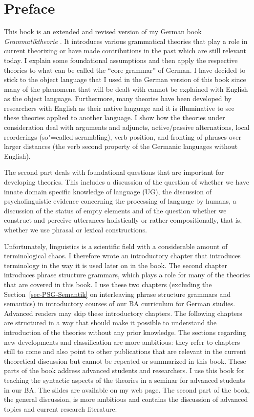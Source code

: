 \chapter{Preface}

This book is an extended and revised version of my German book \emph{Grammatiktheorie}
\citep{MuellerGTBuch2}. It introduces various grammatical theories that play a role in current
theorizing or have made contributions in the past which are still relevant today. I explain some foundational
assumptions and then apply the respective theories to what can be called the ``core grammar'' of
German. I have decided to stick to the object language that I used in the German version of this
book since many of the phenomena that will be dealt with cannot be explained with English as the object
language. Furthermore, many theories have been developed by researchers with English as their native
language and it is illuminative to see these theories applied to another language.
I show how the theories under consideration deal with arguments and adjuncts, active/passive
alternations, local reorderings (so"=called scrambling), verb position, and fronting of phrases over
larger distances (the verb second property of the Germanic languages without English).

The second part deals with foundational questions that are important for developing theories.
This includes a discussion of the question of whether we have innate domain specific knowledge of
language (UG), the discussion of psycholinguistic evidence concerning the processing of language by
humans, a discussion of the status of empty elements and of the question whether we construct and perceive utterances 
holistically or rather compositionally, that is, whether we use phrasal or lexical constructions.

Unfortunately, linguistics is a scientific field 
with a considerable amount of terminological chaos. I therefore wrote an introductory
chapter that introduces terminology in the way it is used later on in the book. The second chapter
introduces phrase structure grammars, which plays a role for many of the theories that are covered
in this book. I use these two chapters (excluding the Section~\ref{sec-PSG-Semantik} on interleaving
phrase structure grammars and semantics) in introductory courses of our BA curriculum for German
studies. Advanced readers may skip these introductory chapters. The following chapters are
structured in a way that should make it possible to understand the introduction of the theories
without any prior knowledge. The sections regarding new developments and classification are more
ambitious: they refer to chapters still to come and also point to other publications that are
relevant in the current theoretical discussion but cannot be repeated or summarized in this
book. These parts of the book address advanced students and researchers. I use this book for teaching
the syntactic aspects of the theories in a seminar for advanced students in our BA. The slides are
available on my web page. The second part of the book, the general discussion, is more ambitious and contains the discussion
of advanced topics and current research literature.

